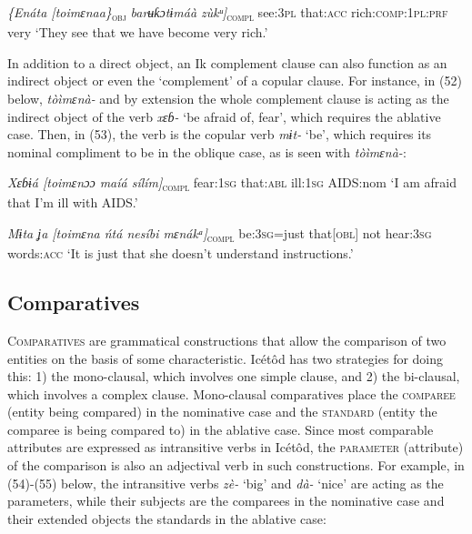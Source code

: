 \begin{table}
\textit{\{Enáta  [toimɛnaa\}}\textsc{\textsubscript{obj}}\textit{ barʉƙɔtɨmáà   zùkᵘ]}\textsc{\textsubscript{compl}}
see:\textsc{3pl}   that:\textsc{acc}    rich:\textsc{comp:1pl:prf}   very
‘They see that we have become very rich.’


In addition to a direct object, an Ik complement clause can also function as an indirect object or even the ‘complement’ of a copular clause. For instance, in (52) below, \textit{tòìmɛnà- }and by extension the whole complement clause is acting as the indirect object of the verb \textit{xɛɓ-} ‘be afraid of, fear’, which requires the ablative case. Then, in (53), the verb is the copular verb \textit{mɨt-} ‘be’, which requires its nominal compliment to be in the oblique case, as is seen with \textit{tòìmɛnà-}:



\textit{Xɛɓɨá     [toimɛnɔɔ   maíá     sílím]}\textsc{\textsubscript{compl}}
fear:\textsc{1sg}   that:\textsc{abl}   ill:\textsc{1sg}   AIDS:nom
‘I am afraid that I’m ill with AIDS.’




\textit{Mɨta ʝa   [toimɛna   ńtá   nesíbi       mɛnákᵃ]}\textsc{\textsubscript{compl}}
be:\textsc{3sg}=just   that[\textsc{obl}]   not   hear:\textsc{3sg} words:\textsc{acc}
‘It is just that she doesn’t understand instructions.’






\subsection{Comparatives}


\textsc{Comparatives} are grammatical constructions that allow the comparison of two entities on the basis of some characteristic. Icétôd has two strategies for doing this: 1) the mono-clausal, which involves one simple clause, and 2) the bi-clausal, which involves a complex clause. Mono-clausal comparatives place the \textsc{comparee }(entity being compared) in the nominative case and the \textsc{standard} (entity the comparee is being compared to) in the ablative case. Since most comparable attributes are expressed as intransitive verbs in Icétôd, the \textsc{parameter} (attribute) of the comparison is also an adjectival verb in such constructions. For example, in (54)-(55) below, the intransitive verbs \textit{zè- }‘big’ and \textit{dà- }‘nice’ are acting as the parameters, while their subjects are the comparees in the nominative case and their extended objects the standards in the ablative case:





\end{table}
